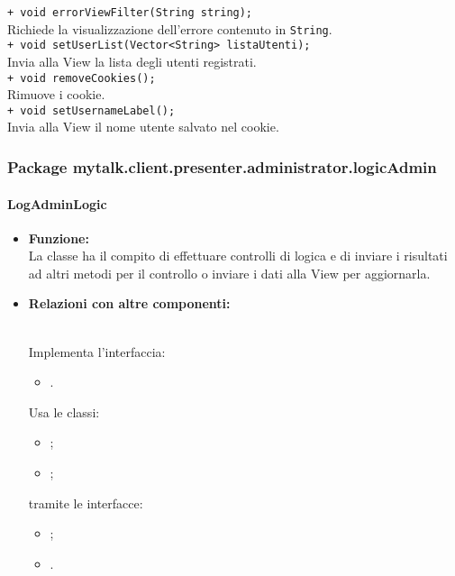 {{\begin{sloppypar}
{{\begin{itemize}
					\texttt{+ void errorViewFilter(String string);}\\
					Richiede la visualizzazione dell’errore contenuto in \texttt{String}.\\
					
					\texttt{+ void setUserList(Vector<String> listaUtenti);}\\
					Invia alla View la lista degli utenti registrati.\\
					
					\texttt{+ void removeCookies();}\\
					Rimuove i cookie\g.\\
					
					\texttt{+ void setUsernameLabel();}\\
					Invia alla View il nome utente salvato nel cookie\g.\\
			\end{itemize}
			}
		
	}
	
	\subsubsection{Package mytalk.client.presenter.administrator.logicAdmin}{


		\paragraph{LogAdminLogic}\label{par:LogAdminLogic}{
				\begin{itemize}
					\item[] \textbf{Funzione:}{\\
					La classe ha il compito di effettuare controlli di logica e di inviare i risultati ad altri metodi per il controllo o inviare i dati alla View per aggiornarla.\\
					}
				
					\item[] \textbf{Relazioni con altre componenti:}{\\
					Implementa l'interfaccia:
					\begin{itemize}
						\item[]	.
					\end{itemize} 		
					Usa le classi:
					\begin{itemize}
						\item[] ;
						\item[] ;
					\end{itemize}
					tramite le interfacce:
					\begin{itemize}
						\item[] ;
						\item[] .\\
					\end{itemize}
					}


\end{itemize}}}
\end{sloppypar}}}
